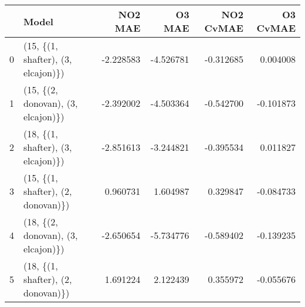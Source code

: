 \begin{tabular}{llrrrr}
\toprule
{} &                               Model &   NO2 MAE &    O3 MAE &  NO2 CvMAE &  O3 CvMAE \\
\midrule
0 &  (15, \{(1, shafter), (3, elcajon)\}) & -2.228583 & -4.526781 &  -0.312685 &  0.004008 \\
1 &  (15, \{(2, donovan), (3, elcajon)\}) & -2.392002 & -4.503364 &  -0.542700 & -0.101873 \\
2 &  (18, \{(1, shafter), (3, elcajon)\}) & -2.851613 & -3.244821 &  -0.395534 &  0.011827 \\
3 &  (15, \{(1, shafter), (2, donovan)\}) &  0.960731 &  1.604987 &   0.329847 & -0.084733 \\
4 &  (18, \{(2, donovan), (3, elcajon)\}) & -2.650654 & -5.734776 &  -0.589402 & -0.139235 \\
5 &  (18, \{(1, shafter), (2, donovan)\}) &  1.691224 &  2.122439 &   0.355972 & -0.055676 \\
\bottomrule
\end{tabular}
